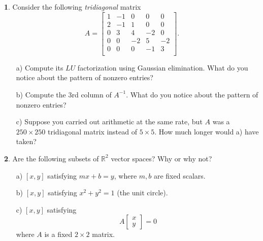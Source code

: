\documentclass{article}
\theoremstyle{definition}
\newtheorem{prob}{}
\begin{document}
\begin{prob}
	Consider the following \emph{tridiagonal} matrix
	\[A=\begin{bmatrix}
		1 & -1& 0&0&0\\
		2&-1&1&0&0\\
		0&3&4&-2&0\\
		0&0&-2&5&-2\\
		0&0&0&-1&3\\
	\end{bmatrix}.\]
\begin{itemize}
	\item[a)] Compute its $LU$ factorization using Gaussian elimination. What do you notice about the pattern of nonzero entries?
	\item[b)] Compute the 3rd column of $A^{-1}$. What do you notice about the pattern of nonzero entries?
	\item[c)] Suppose you carried out arithmetic at the same rate, but $A$ was a $250 \times 250$ tridiagonal matrix instead of $5 \times 5$. How much longer would a) have taken?
\end{itemize}
\end{prob}

\begin{prob} Are the following subsets of $\mathbb{R}^2$ vector spaces? Why or why not?
	\begin{itemize}
		\item [a)] $[x, y]$ satisfying $mx+b=y$, where $m, b$ are fixed scalars.
		\item [b)] $[x,y]$ satisfying $x^2 + y^2 =1$ (the unit circle).
		\item [c)] $[x, y]$ satisfying 
		\[A \begin{bmatrix}
			x \\y
		\end{bmatrix}=0\]
	where $A$ is a fixed $2 \times 2$ matrix.
	\end{itemize}
\end{prob}
\end{document}
